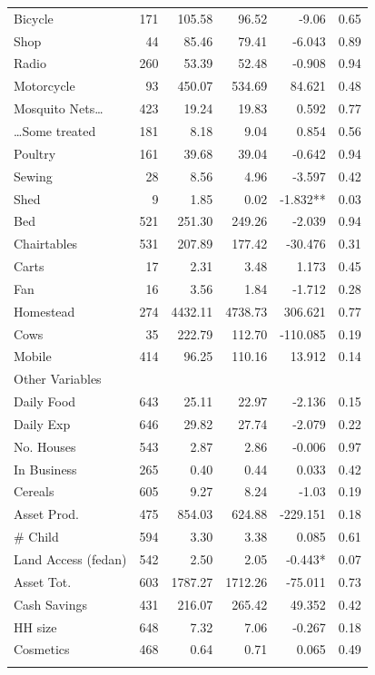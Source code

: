 \documentclass[11pt]{article}
\begin{document}
\begin{longtable}{lrrrrr}
Bicycle & 171 & 105.58 & 96.52 & -9.06 & 0.65\\
Shop & 44 & 85.46 & 79.41 & -6.043 & 0.89\\
Radio & 260 & 53.39 & 52.48 & -0.908 & 0.94\\
Motorcycle & 93 & 450.07 & 534.69 & 84.621 & 0.48\\
Mosquito Nets\ldots{} & 423 & 19.24 & 19.83 & 0.592 & 0.77\\
\ldots{}Some treated & 181 & 8.18 & 9.04 & 0.854 & 0.56\\
Poultry & 161 & 39.68 & 39.04 & -0.642 & 0.94\\
Sewing & 28 & 8.56 & 4.96 & -3.597 & 0.42\\
Shed & 9 & 1.85 & 0.02 & -1.832** & 0.03\\
Bed & 521 & 251.30 & 249.26 & -2.039 & 0.94\\
Chairtables & 531 & 207.89 & 177.42 & -30.476 & 0.31\\
Carts & 17 & 2.31 & 3.48 & 1.173 & 0.45\\
Fan & 16 & 3.56 & 1.84 & -1.712 & 0.28\\
Homestead & 274 & 4432.11 & 4738.73 & 306.621 & 0.77\\
Cows & 35 & 222.79 & 112.70 & -110.085 & 0.19\\
Mobile & 414 & 96.25 & 110.16 & 13.912 & 0.14\\
\hline
Other Variables &  &  &  &  & \\
\hline
Daily Food & 643 & 25.11 & 22.97 & -2.136 & 0.15\\
Daily Exp & 646 & 29.82 & 27.74 & -2.079 & 0.22\\
No. Houses & 543 & 2.87 & 2.86 & -0.006 & 0.97\\
In Business & 265 & 0.40 & 0.44 & 0.033 & 0.42\\
Cereals & 605 & 9.27 & 8.24 & -1.03 & 0.19\\
Asset Prod. & 475 & 854.03 & 624.88 & -229.151 & 0.18\\
\# Child & 594 & 3.30 & 3.38 & 0.085 & 0.61\\
Land Access (fedan) & 542 & 2.50 & 2.05 & -0.443* & 0.07\\
Asset Tot. & 603 & 1787.27 & 1712.26 & -75.011 & 0.73\\
Cash Savings & 431 & 216.07 & 265.42 & 49.352 & 0.42\\
HH size & 648 & 7.32 & 7.06 & -0.267 & 0.18\\
Cosmetics & 468 & 0.64 & 0.71 & 0.065 & 0.49\\
 &  &  &  &  & \\
\end{longtable}
\end{document}
